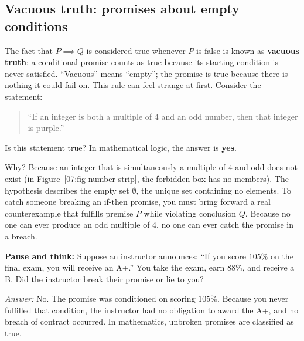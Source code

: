\subsection{Vacuous truth: promises about empty conditions}

The fact that $P \implies Q$ is considered true whenever $P$ is false is known as \textbf{vacuous truth}: a conditional promise counts as true because its starting condition is never satisfied. ``Vacuous'' means ``empty''; the promise is true because there is nothing it could fail on. This rule can feel strange at first. Consider the statement:
\begin{quote}
``If an integer is both a multiple of $4$ and an odd number, then that integer is purple.''
\end{quote}
Is this statement true? In mathematical logic, the answer is \textbf{yes}.

Why? Because an integer that is simultaneously a multiple of $4$ and odd does not exist (in Figure~\ref{07:fig-number-strip}, the forbidden box has no members). The hypothesis describes the empty set $\emptyset$, the unique set containing no elements. To catch someone breaking an if-then promise, you must bring forward a real counterexample that fulfills premise $P$ while violating conclusion $Q$. Because no one can ever produce an odd multiple of $4$, no one can ever catch the promise in a breach.

\begin{recoverybox}
\textbf{Pause and think:} Suppose an instructor announces: ``If you score $105\%$ on the final exam, you will receive an A+.'' You take the exam, earn $88\%$, and receive a B. Did the instructor break their promise or lie to you?

\emph{Answer:} No. The promise was conditioned on scoring $105\%$. Because you never fulfilled that condition, the instructor had no obligation to award the A+, and no breach of contract occurred. In mathematics, unbroken promises are classified as true.
\end{recoverybox}

